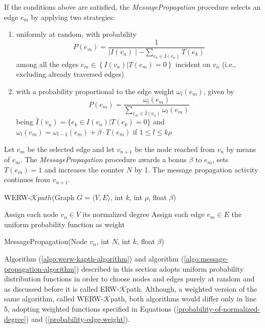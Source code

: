 If the conditions above are satisfied, the \textit{MessagePropagation} procedure selects an edge $e_m$ by applying two strategies:
\begin{enumerate}[label=\alph*.]
	\item uniformly at random, with probability
	\begin{equation}
	P(e_m) = \dfrac{1}{\mid I(v_n) \mid - \sum\limits_{e_k \in I(v_n)} T(e_k)}
	\end{equation}
	among all the edges $e_m \in \left\{ I(v_n) | T(e_m) = 0\right\}$ incident on $v_n$ (i.e., excluding already traversed edges)
	\item with a probability proportional to the edge weight $\omega_l (e_m)$, given by
	\begin{equation}\label{probability-edge-weight}
	P(e_m) = \dfrac{\omega_l (e_m)}{\sum\limits_{e_m \in \hat{I}(v_n)} \omega_l (e_m)}
	\end{equation}
	being $\hat{I}(v_n) = \{e_k \in I(v_n) | T(e_k) = 0\}$ and $\omega_l (e_m) = \omega_{l-1} (e_m) + \beta \cdot T(e_m)$ if $1 \le l \le k\rho$
\end{enumerate}
Let $e_m$ be the selected edge and let $v_{n+1}$ be the node reached from $v_n$ by means of $e_m$. The \textit{MessagePropagation} procedure awards a bonus $\beta$ to $e_m$, sets $T(e_m) = 1$ and increases the counter $N$ by 1. The message propagation activity continues from $v_{n+1}$.

\begin{algorithm}[ht!]
	\caption{WERW-$\mathcal{K}path$(Graph $G = \langle V, E\rangle$, int $k$, int $\rho$, float $\beta$)}
	\label{algo:werw-kapth-algorithm}
	\SetAlgoLined
	\DontPrintSemicolon
	Assign each node $v_n \in V$ its normalized degree\;
	Assign each edge $e_m \in E$ the uniform probability function as weight\;
\end{algorithm}
\begin{algorithm}[ht!]
	\caption{MessagePropagation(Node $v_n$, int $N$, int $k$, float $\beta$)}
	\label{algo:message-propagation-algorithm}
	\SetAlgoLined
	\DontPrintSemicolon
\end{algorithm}
Algorithm (\ref{algo:werw-kapth-algorithm}) and algorithm (\ref{algo:message-propagation-algorithm}) described in this section adopts uniform probability distribution functions in order to choose nodes and edges purely at random and as discussed before it is called ERW-$\mathcal{K}$path. Although, a weighted version of the same algorithm, called WERW-$\mathcal{K}$path, both algorithms would differ only in line 5,  adopting weighted functions specified in Equations (\ref{probability-of-normalized-degree}) and (\ref{probability-edge-weight}).

